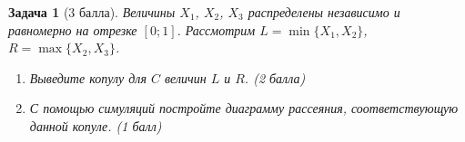 \documentclass[11pt,fleqn]{article}
\newtheorem{esProblem}{Задача}
\begin{document}
\begin{esProblem}[3 балла]
 Величины $X_1$, $X_2$, $X_3$ распределены независимо и равномерно на отрезке $[0;1]$. 
 Рассмотрим $L = \min \{X_1, X_2\}$, $R = \max\{X_2, X_3\}$. 

\begin{enumerate}
\item Выведите копулу для $C$ величин $L$ и $R$. (2 балла)
\item С помощью симуляций постройте диаграмму рассеяния, соответствующую данной копуле. (1 балл)
\end{enumerate}
\end{esProblem}



\newpage
\end{document}
